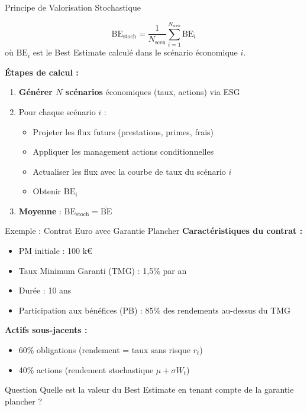 \documentclass[10pt,aspectratio=169,xcolor={dvipsnames}]{beamer}
\newcommand{\BE}{\text{BE}}
\begin{document}
\begin{frame}{Principe de Valorisation Stochastique}
\begin{definition}[BE Stochastique]
\[
\BE_{\text{stoch}} = \frac{1}{N_{\text{scen}}}\sum_{i=1}^{N_{\text{scen}}} \BE_i
\]
où $\BE_i$ est le Best Estimate calculé dans le scénario économique $i$.
\end{definition}

\vspace{0.3cm}
\textbf{Étapes de calcul :}
\begin{enumerate}
    \item \textbf{Générer $N$ scénarios} économiques (taux, actions) via ESG
    \item Pour chaque scénario $i$ :
    \begin{itemize}
        \item Projeter les flux futurs (prestations, primes, frais)
        \item Appliquer les management actions conditionnelles
        \item Actualiser les flux avec la courbe de taux du scénario $i$
        \item Obtenir $\BE_i$
    \end{itemize}
    \item \textbf{Moyenne} : $\BE_{\text{stoch}} = \bar{\BE}$
\end{enumerate}
\end{frame}

\begin{frame}{Exemple : Contrat Euro avec Garantie Plancher}
\textbf{Caractéristiques du contrat :}
\begin{itemize}
    \item PM initiale : 100 k€
    \item Taux Minimum Garanti (TMG) : 1,5\% par an
    \item Durée : 10 ans
    \item Participation aux bénéfices (PB) : 85\% des rendements au-dessus du TMG
\end{itemize}

\vspace{0.3cm}
\textbf{Actifs sous-jacents :}
\begin{itemize}
    \item 60\% obligations (rendement = taux sans risque $r_t$)
    \item 40\% actions (rendement stochastique $\mu + \sigma W_t$)
\end{itemize}

\vspace{0.3cm}
\begin{alertblock}{Question}
Quelle est la valeur du Best Estimate en tenant compte de la garantie plancher ?
\end{alertblock}
\end{frame}
\end{document}
